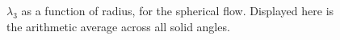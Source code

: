 \begin{figure}[htpb]
    \centering
    \caption[Aviici is love, Aviici is life]{$\lambda_{3}$ as a function of radius, for the spherical flow. Displayed here is the arithmetic average across all solid angles.}
    \label{fig:u0_dom_errs}
\end{figure}

